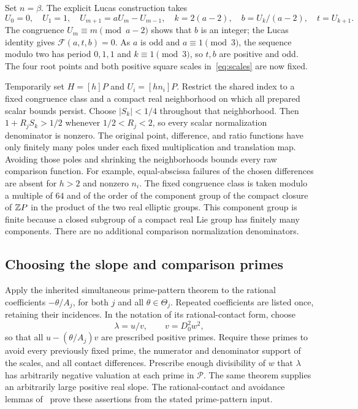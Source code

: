 \documentclass[11pt,a4paper]{article}
\begin{document}
Set $n=\beta$. The explicit Lucas construction takes
\[
 U_0=0,\quad U_1=1,\quad U_{m+1}=aU_m-U_{m-1},\quad
 k=2(a-2),\quad b=U_k/(a-2),\quad t=U_{k+1}.
\]
The congruence $U_m\equiv m\pmod{a-2}$ shows that $b$ is an
integer; the Lucas identity gives $\mathcal F(a,t,b)=0$.
As $a$ is odd and $a\equiv1\pmod3$, the sequence modulo two
has period $0,1,1$ and $k\equiv1\pmod3$, so $t,b$ are positive
and odd. The four root points and both positive square scales
in~\eqref{eq:scales} are now fixed.

Temporarily set $H=[h]P$ and $U_i=[hn_i]P$. Restrict the shared
index to a fixed congruence class and a compact real neighborhood
on which all prepared scalar bounds persist. Choose $|S_k|<1/4$
throughout that neighborhood. Then $1+R_jS_k>1/2$ whenever
$1/2<R_j<2$, so every scalar normalization denominator is nonzero.
The original point, difference, and ratio functions have only finitely
many poles under each fixed multiplication and translation map.
Avoiding those poles and shrinking the neighborhoods bounds every
raw comparison function. For example, equal-abscissa failures of the
chosen differences are absent for $h>2$ and nonzero $n_i$.
The fixed congruence class is taken modulo a multiple of $64$ and
of the order of the component group of the compact closure of
$\mathbb Z P$ in the product of the two real elliptic groups. This component
group is finite because a closed subgroup of a compact real Lie
group has finitely many components.
There are no additional comparison normalization denominators.

\subsection{Choosing the slope and comparison primes}

Apply the inherited simultaneous prime-pattern theorem to the rational
coefficients $-\theta/A_j$, for both $j$ and all
$\theta\in\Theta_j$. Repeated coefficients are listed once,
retaining their incidences. In the notation of its rational-contact
form, choose
\[
                    \lambda=u/v,\qquad v=D_0^2w^2,
\]
so that all $u-(\theta/A_j)v$ are prescribed positive primes.
Require these primes to avoid every previously fixed prime, the
numerator and denominator support of the scales, and all contact
differences. Prescribe enough divisibility of $w$ that $\lambda$
has arbitrarily negative valuation at each prime in $\mathcal P$.
The same theorem supplies an arbitrarily large positive real slope.
The rational-contact and avoidance lemmas of~\cite{Dependencies}
prove these assertions from the stated prime-pattern input.
\end{document}
